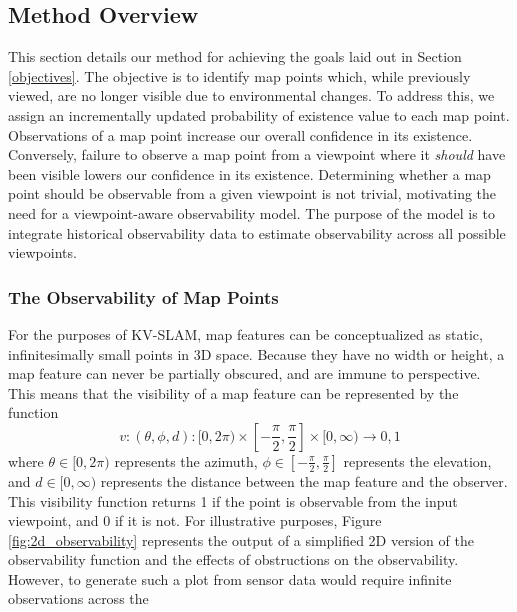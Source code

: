 \subsection{Method Overview}

This section details our method for achieving the goals laid out in Section \ref{objectives}. The objective is to identify map points which, while previously viewed, are no longer visible due to environmental changes. To address this, we assign an incrementally updated probability of existence value to each map point. Observations of a map point increase our overall confidence in its existence. Conversely, failure to observe a map point from a viewpoint where it \textit{should} have been visible lowers our confidence in its existence. Determining whether a map point should be observable from a given viewpoint is not trivial, motivating the need for a viewpoint-aware observability model. The purpose of the model is to integrate historical observability data to estimate observability across all possible viewpoints.

\subsubsection{The Observability of Map Points}

For the purposes of KV-SLAM, map features can be conceptualized as static, infinitesimally small points in 3D space. Because they have no width or height, a map feature can never be partially obscured, and are immune to perspective. This means that the visibility of a map feature can be represented by the function
$$
    v:(\theta,\phi,d):[0,2\pi)\times\left[-\frac{\pi}{2},\frac{\pi}{2}\right]\times[0,\infty)\to{0,1}
$$
where $\theta\in[0,2\pi)$ represents the azimuth, $\phi\in\left[-\frac{\pi}{2},\frac{\pi}{2}\right]$ represents the elevation, and $d\in[0,\infty)$ represents the distance between the map feature and the observer. This visibility function returns 1 if the point is observable from the input viewpoint, and 0 if it is not. For illustrative purposes, Figure \ref{fig:2d_observability} represents the output of a simplified 2D version of the observability function and the effects of obstructions on the observability. However, to generate such a plot from sensor data would require infinite observations across the 

